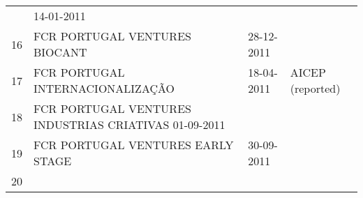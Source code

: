 \documentclass[]{book}
\theoremstyle{definition}
\theoremstyle{definition}
\theoremstyle{definition}
\theoremstyle{remark}
\begin{document}
\begin{longtable}[]{@{}llll@{}}
\begin{minipage}[t]{0.17\columnwidth}
\end{minipage} & \begin{minipage}[t]{0.17\columnwidth}\raggedright\strut
14-01-2011\strut
\end{minipage}\tabularnewline
\begin{minipage}[t]{0.17\columnwidth}\raggedright\strut
16\strut
\end{minipage} & \begin{minipage}[t]{0.17\columnwidth}\raggedright\strut
FCR PORTUGAL VENTURES BIOCANT\strut
\end{minipage} & \begin{minipage}[t]{0.17\columnwidth}\raggedright\strut
28-12-2011\strut
\end{minipage}\tabularnewline
\begin{minipage}[t]{0.17\columnwidth}\raggedright\strut
17\strut
\end{minipage} & \begin{minipage}[t]{0.17\columnwidth}\raggedright\strut
FCR PORTUGAL INTERNACIONALIZAÇÃO\strut
\end{minipage} & \begin{minipage}[t]{0.17\columnwidth}\raggedright\strut
18-04-2011\strut
\end{minipage} & \begin{minipage}[t]{0.17\columnwidth}\raggedright\strut
AICEP (reported)\strut
\end{minipage}\tabularnewline
\begin{minipage}[t]{0.17\columnwidth}\raggedright\strut
18\strut
\end{minipage} & \begin{minipage}[t]{0.17\columnwidth}\raggedright\strut
FCR PORTUGAL VENTURES INDUSTRIAS CRIATIVAS 01-09-2011\strut
\end{minipage}\tabularnewline
\begin{minipage}[t]{0.17\columnwidth}\raggedright\strut
19\strut
\end{minipage} & \begin{minipage}[t]{0.17\columnwidth}\raggedright\strut
FCR PORTUGAL VENTURES EARLY STAGE\strut
\end{minipage} & \begin{minipage}[t]{0.17\columnwidth}\raggedright\strut
30-09-2011\strut
\end{minipage}\tabularnewline
\begin{minipage}[t]{0.17\columnwidth}\raggedright\strut
20\strut
\end{minipage} & \begin{minipage}[t]{0.17\columnwidth}\raggedright\strut

\end{minipage}
\end{longtable}
\end{document}
